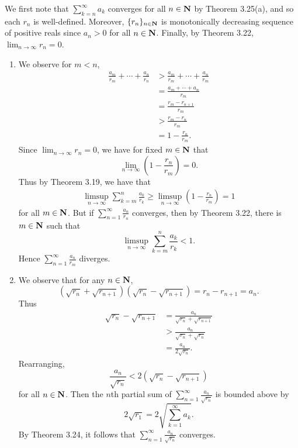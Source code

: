 \begin{ex}
We first note that $\sum_{k = n}^{\infty}a_k$ converges for all $n \in \mathbf{N}$ by Theorem 3.25(a), and so each $r_n$ is well-defined. Moreover, $\{r_n\}_{n \in \mathbf{N}}$ is monotonically decreasing sequence of positive reals since $a_n > 0$ for all $n \in \mathbf{N}$. Finally, by Theorem 3.22, $\lim_{n\to\infty}r_n = 0$.
\begin{enumerate}
\item We observe for $m < n$,
\begin{align*}
\frac{a_m}{r_m} + \cdots + \frac{a_n}{r_n} & > \frac{a_m}{r_m} + \cdots + \frac{a_n}{r_m}\\
& = \frac{a_m + \cdots + a_n}{r_m}\\
& = \frac{r_m-r_{n+1}}{r_m}\\
& > \frac{r_m-r_n}{r_m}\\
& = 1 - \frac{r_n}{r_m}.
\end{align*}
Since $\lim_{n\to\infty}r_n = 0$, we have for fixed $m \in \mathbf{N}$ that \[\lim_{n\to\infty}\left(1 - \frac{r_n}{r_m}\right) = 0.\] Thus by Theorem 3.19, we have that
\begin{align*}
\limsup_{n\to\infty}\sum_{k = m}^n\frac{a_k}{r_k} \geq \limsup_{n\to\infty}\left(1 - \frac{r_n}{r_m}\right) = 1
\end{align*}
for all $m \in \mathbf{N}$. But if $\sum_{n = 1}^{\infty}\frac{a_n}{r_n}$ converges, then by Theorem 3.22, there is $m \in \mathbf{N}$ such that \[\limsup_{n\to\infty}\sum_{k = m}^n\frac{a_k}{r_k} < 1.\] Hence $\sum_{n = 1}^{\infty}\frac{a_n}{r_m}$ diverges.

\item We observe that for any $n \in \mathbf{N}$, \[(\sqrt{r_n} + \sqrt{r_{n+1}})(\sqrt{r_n} - \sqrt{r_{n+1}}) = r_n - r_{n+1} = a_n.\] Thus
\begin{align*}
\sqrt{r_n} - \sqrt{r_{n+1}} & = \frac{a_n}{\sqrt{r_n} + \sqrt{r_{n+1}}}\\
& > \frac{a_n}{\sqrt{r_n} + \sqrt{r_n}}\\
& = \frac{a_n}{2\sqrt{r_n}}.
\end{align*}
Rearranging, \[\frac{a_n}{\sqrt{r_n}} < 2(\sqrt{r_n} - \sqrt{r_{n+1}})\] for all $n \in \mathbf{N}$. Then the $n$th partial sum of $\sum_{n = 1}^{\infty}\frac{a_n}{\sqrt{r_n}}$ is bounded above by \[2\sqrt{r_1} = 2\sqrt{\sum_{k = 1}^{\infty}a_k}.\] By Theorem 3.24, it follows that $\sum_{n = 1}^{\infty}\frac{a_n}{\sqrt{r_n}}$ converges.
\end{enumerate}
\end{ex}

